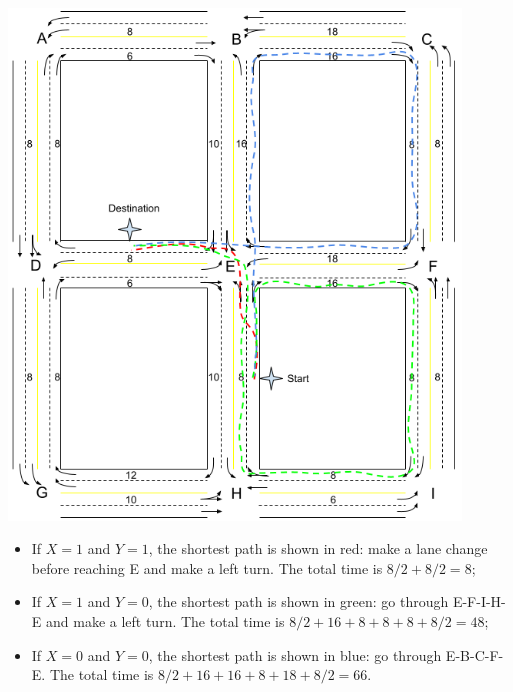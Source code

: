 \begin{center}
	\includegraphics[width=0.9\textwidth]{figure.png}
\end{center}

\begin{itemize}
\item If $X = 1$ and $Y = 1$, the shortest path is shown in red: make a lane change before reaching E and make a left turn. The total time is $8/2+8/2=8$;
\item If $X = 1$ and $Y = 0$, the shortest path is shown in green: go through E-F-I-H-E and make a left turn. The total time is $8/2+16+8+8+8+8/2=48$;
\item If $X = 0$ and $Y = 0$, the shortest path is shown in blue: go through E-B-C-F-E. The total time is $8/2+16+16+8+18+8/2=66$.
\end{itemize}

